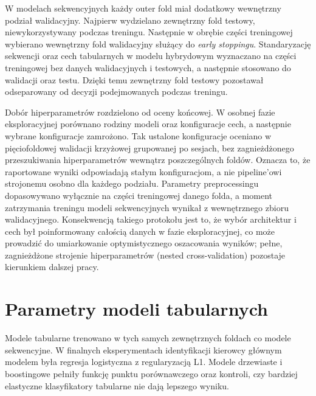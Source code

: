 \documentclass[printmode,pl]{mgr}
\begin{document}
W modelach sekwencyjnych każdy outer fold miał dodatkowy wewnętrzny podział walidacyjny. Najpierw wydzielano zewnętrzny fold testowy, niewykorzystywany podczas treningu. Następnie w obrębie części treningowej wybierano wewnętrzny fold walidacyjny służący do \emph{early stoppingu}. Standaryzację sekwencji oraz cech tabularnych w modelu hybrydowym wyznaczano na części treningowej bez danych walidacyjnych i testowych, a następnie stosowano do walidacji oraz testu. Dzięki temu zewnętrzny fold testowy pozostawał odseparowany od decyzji podejmowanych podczas treningu.

Dobór hiperparametrów rozdzielono od oceny końcowej. W osobnej fazie eksploracyjnej porównano rodziny modeli oraz konfiguracje cech, a następnie wybrane konfiguracje zamrożono. Tak ustalone konfiguracje oceniano w pięciofoldowej walidacji krzyżowej grupowanej po sesjach, bez zagnieżdżonego przeszukiwania hiperparametrów wewnątrz poszczególnych foldów. Oznacza to, że raportowane wyniki odpowiadają stałym konfiguracjom, a nie pipeline'owi strojonemu osobno dla każdego podziału. Parametry preprocessingu dopasowywano wyłącznie na części treningowej danego folda, a moment zatrzymania treningu modeli sekwencyjnych wynikał z wewnętrznego zbioru walidacyjnego. Konsekwencją takiego protokołu jest to, że wybór architektur i cech był poinformowany całością danych w fazie eksploracyjnej, co może prowadzić do umiarkowanie optymistycznego oszacowania wyników; pełne, zagnieżdżone strojenie hiperparametrów (nested cross-validation) pozostaje kierunkiem dalszej pracy.

\section{Parametry modeli tabularnych}

Modele tabularne trenowano w tych samych zewnętrznych foldach co modele sekwencyjne. W finalnych eksperymentach identyfikacji kierowcy głównym modelem była regresja logistyczna z regularyzacją L1. Modele drzewiaste i boostingowe pełniły funkcję punktu porównawczego oraz kontroli, czy bardziej elastyczne klasyfikatory tabularne nie dają lepszego wyniku.
\end{document}
